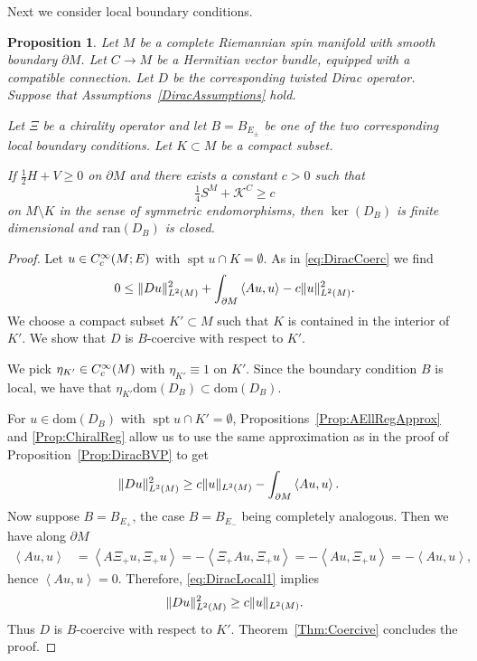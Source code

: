 \documentclass[a4paper,10pt,reqno]{amsart}
\newcommand{\Lp}[2][{}]{{\rm L}^{#2}_{\rm #1}}%
\newcommand{\Ck}[2][{}]{{\rm C}^{#2}_{\rm #1}}%
\newcommand{\ran}{\mathrm{ran}}
\newcommand{\dom}{\mathrm{dom}}
\newcommand{\KK}{\mathscr{K}}
\DeclareMathOperator{\spt}{spt}%
\newcommand{\inprod}[1]{\left\langle #1 \right\rangle}%
\newcommand{\dM}{\partial M}
\newtheorem{proposition}[theorem]{Proposition}
\theoremstyle{definition}
\begin{document}
Next we consider local boundary conditions.

\begin{proposition}\label{Prop:DiracLocalBVP}
Let $M$ be a complete Riemannian spin manifold with smooth boundary $\dM$.
Let $C\to M$ be a Hermitian vector bundle, equipped with a compatible connection.
Let $D$ be the corresponding twisted Dirac operator.
Suppose that Assumptions~\ref{DiracAssumptions} hold.

Let $\Xi$ be a chirality operator and let $B=B_{E_\pm}$ be one of the two corresponding local boundary conditions.
Let $K\subset M$ be a compact subset.


If $\frac12 H+V\ge0$ on $\dM$ and there exists a constant $c>0$ such that
$$
\tfrac14 S^M + \KK^C \ge c
$$
on $M\setminus K$ in the sense of symmetric endomorphisms, then $\ker(D_B)$ is finite dimensional and $\ran(D_B)$ is closed.
\end{proposition}

\begin{proof}
Let $u\in \Ck[c]{\infty}(M;E)$ with $\spt u \cap K = \emptyset$.
As in \eqref{eq:DiracCoerc} we find
\begin{equation*}
0 \le \|Du\|_{\Lp{2}(M)}^2 + \int_{\dM}\inprod{Au,u} - c\|u\|_{\Lp{2}(M)}^2 .
\end{equation*}
We choose a compact subset $K'\subset M$ such that $K$ is contained in the interior of $K'$.
We show that $D$ is $B$-coercive with respect to $K'$.

We pick $\eta_{K'}\in\Ck[c]{\infty}(M)$ with $\eta_{K'}\equiv 1$ on $K'$.
Since the boundary condition $B$ is local, we have that $\eta_{K'}\dom(D_B)\subset\dom(D_B)$.

For $u\in \dom(D_B)$ with $\spt u\cap K'=\emptyset$, Propositions~\ref{Prop:AEllRegApprox} and \ref{Prop:ChiralReg} allow us to use the same approximation as in the proof of Proposition~\ref{Prop:DiracBVP} to get
\begin{align}
\|Du\|_{\Lp{2}(M)}^2
 & \ge
c\|u\|_{\Lp{2}(M)} - \int_{\dM}\inprod{Au,u} .
\label{eq:DiracLocal1}
\end{align}
Now suppose $B=B_{E_+}$, the case $B=B_{E_-}$ being completely analogous.
Then we have along $\dM$
\begin{align*}
\inprod{Au,u}
&=
\inprod{A\Xi_+u,\Xi_+u}
=
-\inprod{\Xi_+Au,\Xi_+u}
=
-\inprod{Au,\Xi_+u}
=
-\inprod{Au,u},
\end{align*}
hence $\inprod{Au,u}=0$.
Therefore, \eqref{eq:DiracLocal1} implies
\[
\|Du\|_{\Lp{2}(M)}^2 \ge c\|u\|_{\Lp{2}(M)} .
\]
Thus $D$ is $B$-coercive with respect to $K'$.
Theorem~\ref{Thm:Coercive} concludes the proof.
\end{proof}
\end{document}
